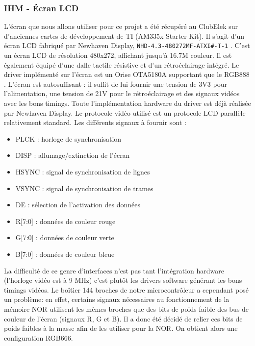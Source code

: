 \subsubsection{IHM - Écran LCD}       
L'écran que nous allons utiliser pour ce projet a été récupéré au ClubElek sur d'anciennes cartes de développement de TI (AM335x Starter Kit). 
Il s'agit d'un écran LCD fabriqué par Newhaven Display, \verb$NHD-4.3-480272MF-ATXI#-T-1$ \autocite{newhaven:NHD}. 
C'est un écran LCD de résolution 480x272, affichant jusqu'à 16.7M couleur. 
Il est également équipé d'une dalle tactile résistive et d'un rétroéclairage intégré. 
Le driver implémenté sur l'écran est un Orise OTA5180A supportant que le RGB888 \autocite{orise:OTA5180A}. 
L'écran est autosuffisant : il suffit de lui fournir une tension de 3V3 pour l'alimentation, une tension de 21V pour le rétroéclairage et des signaux vidéos avec les bons timings. 
Toute l'implémentation hardware du driver est déjà réalisée par Newhaven Display.
Le protocole vidéo utilisé est un protocole LCD parallèle relativement standard. Les différents signaux à fournir sont :
        
\begin{itemize}
	\item PLCK : horloge de synchronisation
	\item DISP : allumage/extinction de l'écran
	\item HSYNC : signal de synchronisation de lignes
	\item VSYNC : signal de synchronisation de trames 
	\item DE : sélection de l'activation des données
	\item R[7:0] : données de couleur rouge
	\item G[7:0] : données de couleur verte 
	\item B[7:0] : données de couleur bleue
\end{itemize}
            
La difficulté de ce genre d'interfaces n'est pas tant l'intégration hardware (l'horloge vidéo est à 9 MHz) c'est plutôt les drivers software générant les bons timings vidéos.
Le boîtier 144 broches de notre microcontrôleur a cependant posé un problème: en effet, certains signaux nécessaires au fonctionnement de la mémoire NOR utilisent les mêmes broches que des bits de poids faible des bus de couleur de l'écran (signaux R, G et B).
Il a donc été décidé de relier ces bits de poids faibles à la masse afin de les utiliser pour la NOR.
On obtient alors une configuration RGB666.
            
